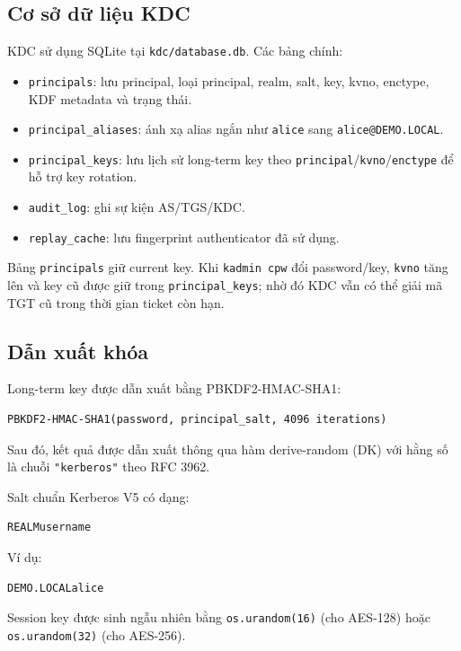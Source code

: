 \documentclass[12pt]{article}
\begin{document}
\subsection{Cơ sở dữ liệu KDC}

KDC sử dụng SQLite tại \texttt{kdc/database.db}. Các bảng chính:
\begin{itemize}
    \item \texttt{principals}: lưu principal, loại principal, realm, salt, key, kvno, enctype, KDF metadata và trạng thái.
    \item \texttt{principal\_aliases}: ánh xạ alias ngắn như \texttt{alice} sang \texttt{alice@DEMO.LOCAL}.
    \item \texttt{principal\_keys}: lưu lịch sử long-term key theo \texttt{principal}/\texttt{kvno}/\texttt{enctype} để hỗ trợ key rotation.
    \item \texttt{audit\_log}: ghi sự kiện AS/TGS/KDC.
    \item \texttt{replay\_cache}: lưu fingerprint authenticator đã sử dụng.
\end{itemize}

Bảng \texttt{principals} giữ current key. Khi \texttt{kadmin cpw} đổi password/key, \texttt{kvno} tăng lên và key cũ được giữ trong \texttt{principal\_keys}; nhờ đó KDC vẫn có thể giải mã TGT cũ trong thời gian ticket còn hạn.

\subsection{Dẫn xuất khóa}

Long-term key được dẫn xuất bằng PBKDF2-HMAC-SHA1:

\begin{lstlisting}[style=textcode]
PBKDF2-HMAC-SHA1(password, principal_salt, 4096 iterations)
\end{lstlisting}
Sau đó, kết quả được dẫn xuất thông qua hàm derive-random (DK) với hằng số là chuỗi \texttt{"kerberos"} theo RFC 3962.

Salt chuẩn Kerberos V5 có dạng:

\begin{lstlisting}[style=textcode]
REALMusername
\end{lstlisting}

Ví dụ:

\begin{lstlisting}[style=textcode]
DEMO.LOCALalice
\end{lstlisting}

Session key được sinh ngẫu nhiên bằng \texttt{os.urandom(16)} (cho AES-128) hoặc \texttt{os.urandom(32)} (cho AES-256).
\end{document}
